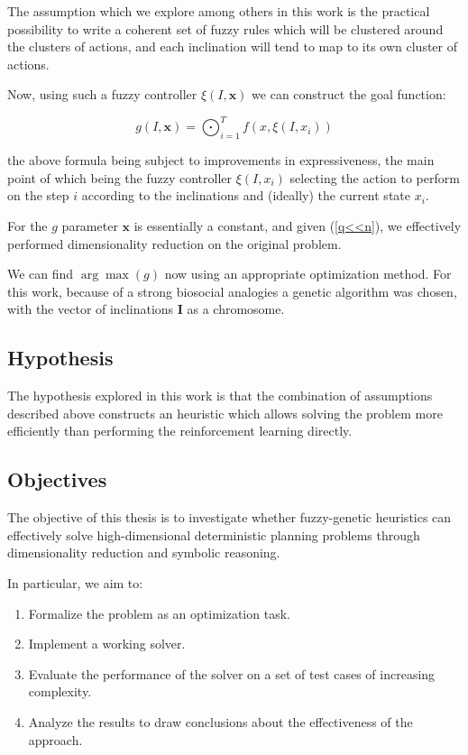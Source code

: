\documentclass[11pt, a4paper]{article}
\begin{document}
	The assumption which we explore among others in this work is the practical possibility to write a coherent set of fuzzy rules which will be clustered around the clusters of actions, and each inclination will tend to map to its own cluster of actions.
	
	Now, using such a fuzzy controller $\xi(I, \mathbf{x})$ we can construct the goal function:
	
	\begin{equation}
		g(I, \mathbf{x}) = \bigodot_{i=1}^{T} f(x, \xi(I, x_i))
	\end{equation}
	
	the above formula being subject to improvements in expressiveness,
	the main point of which being the fuzzy controller $\xi(I, x_i)$ selecting the action to perform on the step $i$ according to the inclinations and (ideally) the current state $x_i$.
	
	For the $g$ parameter $\mathbf{x}$ is essentially a constant, and given (\ref{q<<n}),
	we effectively performed dimensionality reduction on the original problem.
	
	We can find $\arg \max(g)$ now using an appropriate optimization method.
	For this work, because of a strong biosocial analogies a genetic algorithm\cite{mitchell1999geneticalgorithms} was chosen,
	with the vector of inclinations $\mathbf{I}$ as a chromosome.
	
	\subsection{Hypothesis}
	The hypothesis explored in this work is that the combination of assumptions described above constructs an heuristic which allows solving the problem more efficiently than performing the reinforcement learning directly.
	
	\subsection{Objectives}
	The objective of this thesis is to investigate whether fuzzy-genetic heuristics can effectively solve high-dimensional deterministic planning problems through dimensionality reduction and symbolic reasoning.
	
	In particular, we aim to:
	\begin{enumerate}
		\item Formalize the problem as an optimization task.
		\item Implement a working solver.
		\item Evaluate the performance of the solver on a set of test cases of increasing complexity.
		\item Analyze the results to draw conclusions about the effectiveness of the approach.
	\end{enumerate}
\end{document}
